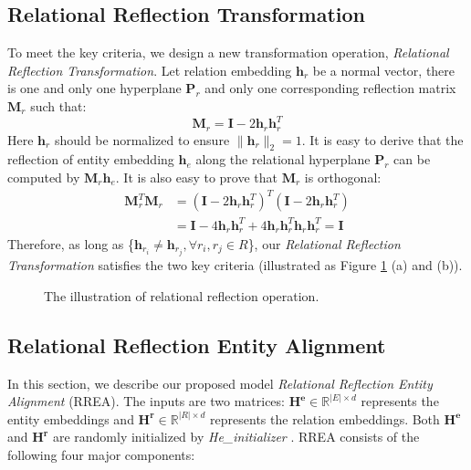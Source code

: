 \documentclass[sigconf,camera-ready]{acmart}
\begin{document}
\subsection{Relational Reflection Transformation}
To meet the key criteria, we design a new transformation operation, \emph{Relational Reflection Transformation}.
Let relation embedding $\bm{h}_r$ be a normal vector, there is one and only one hyperplane $\bm{P}_r$ and only one corresponding reflection matrix $\bm{M}_r$ such that:
\begin{equation}
    \bm{M}_r= \bm{I}-2\bm{h}_r\bm{h}_r^T
\end{equation}
Here $\bm{h}_r$ should be normalized to ensure $\|\bm{h}_r\|_2=1$.
It is easy to derive that the reflection of entity embedding $\bm{h}_e$ along the relational hyperplane $\bm{P}_r$ can be computed by $\bm{M}_r\bm{h}_e$.
It is also easy to prove that $\bm{M}_r$ is orthogonal:
\begin{equation}
\begin{aligned}
    \bm{M}_r^T\bm{M}_r &= (\bm{I}-2\bm{h}_r\bm{h}_r^T)^T(\bm{I}-2\bm{h}_r\bm{h}_r^T)\\
             &= \bm{I} - 4\bm{h}_r\bm{h}_r^T + 4\bm{h}_r\bm{h}_r^T\bm{h}_r\bm{h}_r^T = \bm{I}
\end{aligned}
\end{equation}
Therefore, as long as \{$\bm{h}_{r_i} \neq \bm{h}_{r_j}, \forall r_i,r_j \in R$\}, our \emph{Relational Reflection Transformation} satisfies the two key criteria (illustrated as Figure \ref{mirror} (a) and (b)).

\begin{figure}[t]
  \caption{The illustration of relational reflection operation.}\label{mirror}
\end{figure}


\subsection{Relational Reflection Entity Alignment}
In this section, we describe our proposed model \emph{Relational Reflection Entity Alignment} (RREA).
The inputs are two matrices: $\bm{H^e}\in\mathbb{R}^{\vert E\vert\times d}$ represents the entity embeddings and $\bm{H^r}\in\mathbb{R}^{\vert R\vert\times d}$ represents the relation embeddings.
Both $\bm{H^e}$ and $\bm{H^r}$ are randomly initialized by \emph{He\_initializer} \cite{DBLP:conf/iccv/HeZRS15}.
RREA consists of the following four major components:
\end{document}
